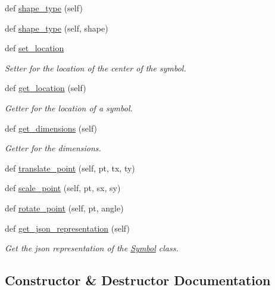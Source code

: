 \begin{DoxyCompactItemize}
def \mbox{\hyperlink{classbridges_1_1symbol_1_1_symbol_a86813f0f1a7ecbe5c52725730c887e75}{shape\+\_\+type}} (self)
\item 
def \mbox{\hyperlink{classbridges_1_1symbol_1_1_symbol_aea966b54a55c137ec15e849829fc9be9}{shape\+\_\+type}} (self, shape)
\item 
def \mbox{\hyperlink{classbridges_1_1symbol_1_1_symbol_a616aeca9f529ed61300e92e63cbbaf99}{set\+\_\+location}}
\begin{DoxyCompactList}\small\item\em Setter for the location of the center of the symbol. \end{DoxyCompactList}\item 
def \mbox{\hyperlink{classbridges_1_1symbol_1_1_symbol_a8abbc9a5c77eb7e2ef40338102a145c4}{get\+\_\+location}} (self)
\begin{DoxyCompactList}\small\item\em Getter for the location of a symbol. \end{DoxyCompactList}\item 
def \mbox{\hyperlink{classbridges_1_1symbol_1_1_symbol_ae53057317f11148bbbf7c17c671cac2d}{get\+\_\+dimensions}} (self)
\begin{DoxyCompactList}\small\item\em Getter for the dimensions. \end{DoxyCompactList}\item 
def \mbox{\hyperlink{classbridges_1_1symbol_1_1_symbol_a9600a66f48ad38baf42a2043db13334b}{translate\+\_\+point}} (self, pt, tx, ty)
\item 
def \mbox{\hyperlink{classbridges_1_1symbol_1_1_symbol_a963b55370096aa7314b03a2a34da2929}{scale\+\_\+point}} (self, pt, sx, sy)
\item 
def \mbox{\hyperlink{classbridges_1_1symbol_1_1_symbol_a81d55230ba4fec6c9a31d76cfc97bc96}{rotate\+\_\+point}} (self, pt, angle)
\item 
def \mbox{\hyperlink{classbridges_1_1symbol_1_1_symbol_a746f8e6d1fd1c63c8a9140a2af7436f8}{get\+\_\+json\+\_\+representation}} (self)
\begin{DoxyCompactList}\small\item\em Get the json representation of the \mbox{\hyperlink{classbridges_1_1symbol_1_1_symbol}{Symbol}} class. \end{DoxyCompactList}\end{DoxyCompactItemize}


\subsection{Constructor \& Destructor Documentation}
\mbox{\label{classbridges_1_1symbol_1_1_symbol_a57c7fcd41baccb9c2e15c9c828d957f6}} 
